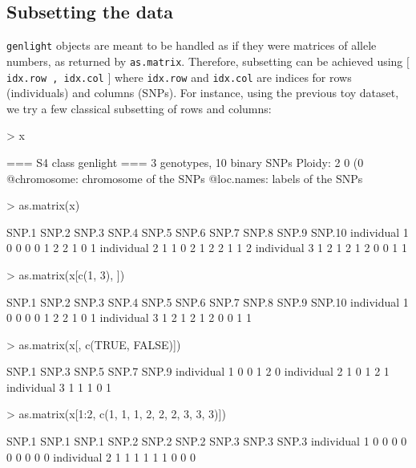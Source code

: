 \documentclass{article}
\begin{document}
\subsection{Subsetting the data}
\texttt{genlight} objects are meant to be handled as if they were matrices of allele numbers, as
returned by \texttt{as.matrix}.
Therefore, subsetting can be achieved using $[$ \texttt{idx.row , idx.col} $]$ where \texttt{idx.row}
and \texttt{idx.col} are indices for rows (individuals) and columns (SNPs).
For instance, using the previous toy dataset, we try a few classical subsetting of rows and columns:
\begin{Schunk}
\begin{Sinput}
> x
\end{Sinput}
\begin{Soutput}
 === S4 class genlight ===
 3 genotypes,  10 binary SNPs
 Ploidy: 2
 0 (0 %
 @chromosome: chromosome of the SNPs
 @loc.names: labels of the SNPs
\end{Soutput}
\begin{Sinput}
> as.matrix(x)
\end{Sinput}
\begin{Soutput}
             SNP.1 SNP.2 SNP.3 SNP.4 SNP.5 SNP.6 SNP.7 SNP.8 SNP.9 SNP.10
individual 1     0     0     0     0     1     2     2     1     0      1
individual 2     1     1     0     2     1     2     2     1     1      2
individual 3     1     2     1     2     1     2     0     0     1      1
\end{Soutput}
\begin{Sinput}
> as.matrix(x[c(1, 3), ])
\end{Sinput}
\begin{Soutput}
             SNP.1 SNP.2 SNP.3 SNP.4 SNP.5 SNP.6 SNP.7 SNP.8 SNP.9 SNP.10
individual 1     0     0     0     0     1     2     2     1     0      1
individual 3     1     2     1     2     1     2     0     0     1      1
\end{Soutput}
\begin{Sinput}
> as.matrix(x[, c(TRUE, FALSE)])
\end{Sinput}
\begin{Soutput}
             SNP.1 SNP.3 SNP.5 SNP.7 SNP.9
individual 1     0     0     1     2     0
individual 2     1     0     1     2     1
individual 3     1     1     1     0     1
\end{Soutput}
\begin{Sinput}
> as.matrix(x[1:2, c(1, 1, 1, 2, 2, 2, 3, 3, 3)])
\end{Sinput}
\begin{Soutput}
             SNP.1 SNP.1 SNP.1 SNP.2 SNP.2 SNP.2 SNP.3 SNP.3 SNP.3
individual 1     0     0     0     0     0     0     0     0     0
individual 2     1     1     1     1     1     1     0     0     0
\end{Soutput}
\end{Schunk}
\end{document}
